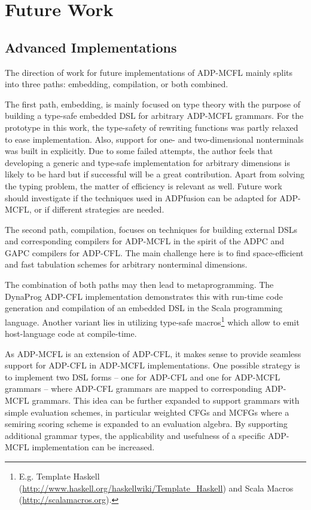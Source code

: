 \documentclass[
    a4paper,
    12pt,
    twoside,
    BCOR=12mm,
    parskip=half,
    chapterprefix,
    numbers=noenddot,
    bibliography=totoc
]{scrbook}
\begin{document}
\section{Future Work}

\subsection*{Advanced Implementations}

The direction of work for future implementations of ADP-MCFL mainly splits into three paths: embedding, compilation, or both combined.

The first path, embedding, is mainly focused on type theory with the purpose of building a type-safe embedded \gls{DSL} for arbitrary ADP-MCFL grammars. For the prototype in this work, the type-safety of rewriting functions was partly relaxed to ease implementation. Also, support for one- and two-dimensional nonterminals was built in explicitly. Due to some failed attempts, the author feels that developing a generic and type-safe implementation for arbitrary dimensions is likely to be hard but if successful will be a great contribution. Apart from solving the typing problem, the matter of efficiency is relevant as well. Future work should investigate if the techniques used in ADPfusion can be adapted for ADP-MCFL, or if different strategies are needed.

The second path, compilation, focuses on techniques for building external \glspl{DSL} and corresponding compilers for ADP-MCFL in the spirit of the ADPC and GAPC compilers for ADP-CFL. The main challenge here is to find space-efficient and fast tabulation schemes for arbitrary nonterminal dimensions.

The combination of both paths may then lead to metaprogramming. The DynaProg ADP-CFL implementation demonstrates this with run-time code generation and compilation of an embedded \gls{DSL} in the Scala programming language. Another variant lies in utilizing type-safe macros\footnote{E.g. Template Haskell (\url{http://www.haskell.org/haskellwiki/Template_Haskell}) and Scala Macros (\url{http://scalamacros.org}).} which allow to emit host-language code at compile-time.

As ADP-MCFL is an extension of ADP-CFL, it makes sense to provide seamless support for ADP-CFL in  ADP-MCFL implementations. One possible strategy is to implement two \gls{DSL} forms -- one for ADP-CFL and one for ADP-MCFL grammars -- where ADP-CFL grammars are mapped to corresponding ADP-MCFL grammars. This idea can be further expanded to support grammars with simple evaluation schemes, in particular weighted \glspl{CFG} and \glspl{MCFG} where a semiring scoring scheme is expanded to an evaluation algebra. By supporting additional grammar types, the applicability and usefulness of a specific ADP-MCFL implementation can be increased.
\end{document}
